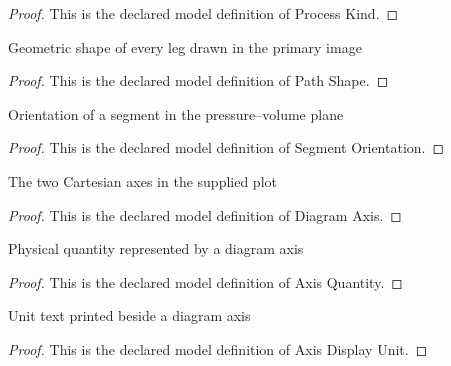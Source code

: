\begin{proof}
  This is the declared model definition of Process Kind.
\end{proof}
\begin{definition}
  \label{def:physics:phyx-mini-0433:phyxminiproblems-problemphyxmini0433-pathshape}
  Geometric shape of every leg drawn in the primary image
\end{definition}
\begin{proof}
  This is the declared model definition of Path Shape.
\end{proof}
\begin{definition}
  \label{def:physics:phyx-mini-0433:phyxminiproblems-problemphyxmini0433-segmentorientation}
  Orientation of a segment in the pressure--volume plane
\end{definition}
\begin{proof}
  This is the declared model definition of Segment Orientation.
\end{proof}
\begin{definition}
  \label{def:physics:phyx-mini-0433:phyxminiproblems-problemphyxmini0433-diagramaxis}
  The two Cartesian axes in the supplied plot
\end{definition}
\begin{proof}
  This is the declared model definition of Diagram Axis.
\end{proof}
\begin{definition}
  \label{def:physics:phyx-mini-0433:phyxminiproblems-problemphyxmini0433-axisquantity}
  Physical quantity represented by a diagram axis
\end{definition}
\begin{proof}
  This is the declared model definition of Axis Quantity.
\end{proof}
\begin{definition}
  \label{def:physics:phyx-mini-0433:phyxminiproblems-problemphyxmini0433-axisdisplayunit}
  Unit text printed beside a diagram axis
\end{definition}
\begin{proof}
  This is the declared model definition of Axis Display Unit.
\end{proof}
